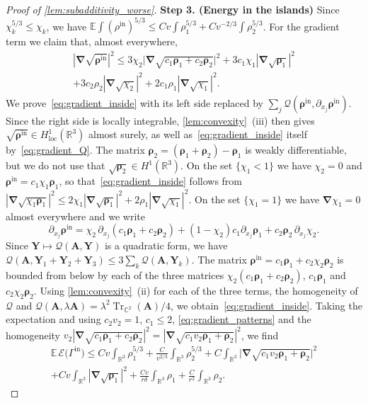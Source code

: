 \documentclass[final,reqno]{amsart}
\theoremstyle{remark}
\renewcommand{\le}{\leqslant}
\DeclareMathOperator{\Tr}{Tr}
\newcommand{\Trs}{\Tr_{\CC^2}}
\newcommand{\RR}{\mathbb{R}}
\newcommand{\CC}{\mathbb{C}}
\newcommand{\EE}{\mathbb{E}}
\newcommand{\grad}{\bm{\nabla}}
\newcommand{\EC}{\mathcal{E}}
\newcommand{\QC}{\mathcal{Q}}
\begin{document}
\begin{proof}[Proof of \cref{lem:subadditivity_worse}]
\medskip

\noindent\textbf{Step 3. (Energy in the islands)} Since $\chi_k^{5/3}\le\chi_k$, we have $\EE\int(\rho^{\mathrm{in}})^{5/3}\le Cv\int\rho_1^{5/3}+Cv^{-2/3}\int\rho_2^{5/3}$. For the gradient term we claim that, almost everywhere,
\begin{multline}\label{eq:gradient_inside}
|\grad\sqrt{\bm{\rho}^{\mathrm{in}}}|^2\le 3\chi_2\big|\grad\sqrt{c_1\bm{\rho}_1+c_2\bm{\rho}_2}\big|^2+3c_1\chi_1|\grad\sqrt{\bm{\rho}_1}|^2\\
+3c_2\rho_2|\grad\sqrt{\chi_2}|^2+2c_1\rho_1|\grad\sqrt{\chi_1}|^2.
\end{multline}
We prove~\cref{eq:gradient_inside} with its left side replaced by $\sum_j\QC(\bm{\rho}^{\mathrm{in}},\partial_{x_j}\bm{\rho}^{\mathrm{in}})$. Since the right side is locally integrable, \cref{lem:convexity}~(iii) then gives $\sqrt{\bm{\rho}^{\mathrm{in}}}\in H^1_{\mathrm{loc}}(\RR^3)$ almost surely, as well as~\cref{eq:gradient_inside} itself by~\cref{eq:gradient_Q}. The matrix $\bm{\rho}_2=(\bm{\rho}_1+\bm{\rho}_2)-\bm{\rho}_1$ is weakly differentiable, but we do not use that $\sqrt{\bm{\rho}_2}\in H^1(\RR^3)$. On the set $\{\chi_1<1\}$ we have $\chi_2=0$ and $\bm{\rho}^{\mathrm{in}}=c_1\chi_1\bm{\rho}_1$, so that~\cref{eq:gradient_inside} follows from $|\grad\sqrt{\chi_1\bm{\rho}_1}|^2\le2\chi_1|\grad\sqrt{\bm{\rho}_1}|^2+2\rho_1|\grad\sqrt{\chi_1}|^2$. On the set $\{\chi_1=1\}$ we have $\grad\chi_1=0$ almost everywhere and we write
$$
\partial_{x_j}\bm{\rho}^{\mathrm{in}}=\chi_2\,\partial_{x_j}(c_1\bm{\rho}_1+c_2\bm{\rho}_2)+(1-\chi_2)c_1\partial_{x_j}\bm{\rho}_1+c_2\bm{\rho}_2\,\partial_{x_j}\chi_2.
$$
Since $\mathbf{Y}\mapsto\QC(\mathbf{A},\mathbf{Y})$ is a quadratic form, we have $\QC(\mathbf{A},\mathbf{Y}_1+\mathbf{Y}_2+\mathbf{Y}_3)\le3\sum_k\QC(\mathbf{A},\mathbf{Y}_k)$. The matrix $\bm{\rho}^{\mathrm{in}}=c_1\bm{\rho}_1+c_2\chi_2\bm{\rho}_2$ is bounded from below by each of the three matrices $\chi_2(c_1\bm{\rho}_1+c_2\bm{\rho}_2)$, $c_1\bm{\rho}_1$ and $c_2\chi_2\bm{\rho}_2$. Using \cref{lem:convexity}~(ii) for each of the three terms, the homogeneity of $\QC$ and $\QC(\mathbf{A},\lambda \mathbf{A})=\lambda^2\Trs(\mathbf{A})/4$, we obtain~\cref{eq:gradient_inside}. Taking the expectation and using $c_2v_2=1$, $c_1\le2$, \cref{eq:gradient_patterns} and the homogeneity $v_2|\grad\sqrt{c_1\bm{\rho}_1+c_2\bm{\rho}_2}|^2=|\grad\sqrt{c_1v_2\bm{\rho}_1+\bm{\rho}_2}|^2$, we find
\begin{multline}\label{eq:inside}
\EE\,\EC\big(\Gamma^{\mathrm{in}}\big)\le Cv\int_{\RR^3}\rho_1^{5/3}+\frac{C}{v^{2/3}}\int_{\RR^3}\rho_2^{5/3}+C\int_{\RR^3}\big|\grad\sqrt{c_1v_2\bm{\rho}_1+\bm{\rho}_2}\big|^2\\
+Cv\int_{\RR^3}|\grad\sqrt{\bm{\rho}_1}|^2+\frac{Cv}{r\delta}\int_{\RR^3}\rho_1+\frac{C}{r^2}\int_{\RR^3}\rho_2.
\end{multline}


\end{proof}
\end{document}
